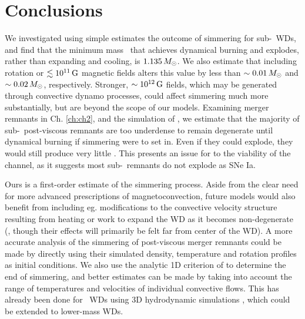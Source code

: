 \section{Conclusions}
\label{ssec:c5_conclusions}

We investigated using simple estimates the outcome of simmering for sub-\Mch\ WDs, and find that the minimum mass \Mcrit\ that achieves dynamical burning and explodes, rather than expanding and cooling, is $1.135\,\Msun$.  We also estimate that including rotation or $\lesssim 10^{11}\,\mathrm{G}$ magnetic fields alters this value by less than $\sim0.01\,\Msun$ and $\sim0.02\,\Msun$, respectively.  Stronger, $\sim10^{12}\,\mathrm{G}$ fields, which may be generated through convective dynamo processes, could affect simmering much more substantially, but are beyond the scope of our models.  Examining merger remnants in Ch. \ref{ch:ch2}, and the simulation of \cite{ji+13}, we estimate that the majority of sub-\Mch\ post-viscous remnants are too underdense to remain degenerate until dynamical burning if simmering were to set in.  Even if they could explode, they would still produce very little \Ni.  This presents an issue for to the viability of the \citeal{vkercj10} channel, as it suggests most sub-\Mch\ remnants do not explode as SNe Ia.


Ours is a first-order estimate of the simmering process.  Aside from the clear need for more advanced prescriptions of magnetoconvection, future models would also benefit from including eg. modifications to the convective velocity structure resulting from heating or work to expand the WD as it becomes non-degenerate (\citeal{piroc08}, though their effects will primarily be felt far from center of the WD).  A more accurate analysis of the simmering of post-viscous merger remnants could be made by directly using their simulated density, temperature and rotation profiles as initial conditions.  We also use the analytic 1D criterion of \citeal{wooswk04} to determine the end of simmering, and better estimates can be made by taking into account the range of temperatures and velocities of individual convective flows.  This has already been done for \Mch\ WDs using 3D hydrodynamic simulations \citep{kuhlwg06, zing+09, zing+11, nona+12}, which could be extended to lower-mass WDs.

